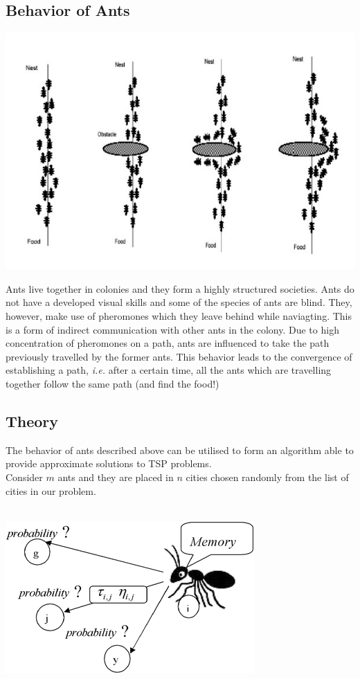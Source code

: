 \documentclass[14pt, english]{article}
\begin{document}
\subsection{Behavior of Ants}

\begin{center}
\includegraphics[scale=0.5]{antfood.jpg}
\end{center}

Ants live together in colonies and they form a highly structured societies. Ants do not have a developed visual skills and some of the species of ants are blind. They, however, make use of pheromones which they leave behind while naviagting. This is a form of indirect communication with other ants in the colony. Due to high concentration of pheromones on a path, ants are influenced to take the path previously travelled by the former ants. This behavior leads to the convergence of establishing a path, \emph{i.e.} after a certain time, all the ants which are travelling together follow the same path (and find the food!)
 
\subsection{Theory}

The behavior of ants described above can be utilised to form an algorithm able to provide approximate solutions to TSP problems.\\

\noindent
Consider $m$ ants and they are placed in $n$ cities chosen randomly from the list of cities in our problem.\\
\\
\begin{center}
\includegraphics[scale=0.5]{ant.png}
\end{center}
\end{document}
